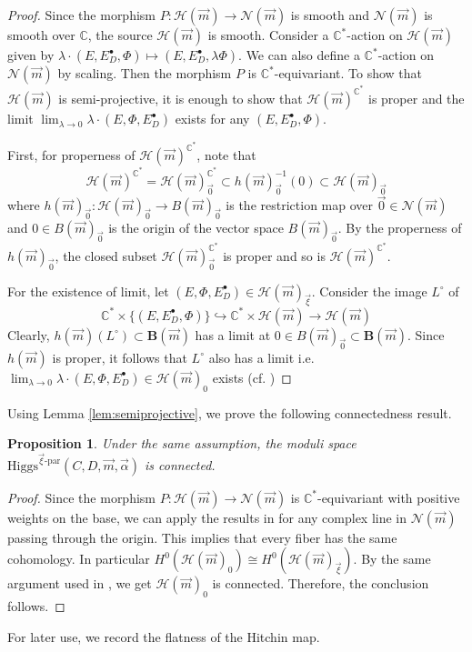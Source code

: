 \documentclass[11pt]{amsart}
\theoremstyle{plain}
\newtheorem{proposition}[theorem]{Proposition}
\theoremstyle{definition}
\theoremstyle{remark}
\newcommand{\C}{\mathbb C}
\newcommand{\Higgs}{\mathrm{Higgs}}
\newcommand{\nmd}{\mathcal{N}(\vec{m})}
\def\C{\mathbb{C}}
\def\m{\mu}
\def\m{\mathcal}
\def\vxi{\vec{\xi}}
\def\vm{\vec{m}}
\def\nm{\mathcal{N}(\vm)}
\begin{document}
\begin{proof}
Since the morphism $P:\bm{\m{H}}(\vm) \to \nmd$ is smooth and $\nmd$ is smooth over $\C$, the source $\bm{\m{H}}(\vm)$ is smooth. Consider a $\C^*$-action on $\bm{{\m{H}}}(\vec{m})$ given by $\lambda \cdot (E,E_D^\bullet, \Phi) \mapsto (E,E_D^\bullet, \lambda\Phi)$. We can also define a $\C^*$-action on $\nmd$ by scaling. Then the morphism $P$ is $\C^*$-equivariant. To show that $\bm{\m{H}}(\vm)$ is semi-projective, it is enough to show that ${\bm{\m{H}}(\vm)}^{\C^*}$ is proper and the limit $\lim_{\lambda \to 0} \lambda \cdot (E,\Phi,E^\bullet_D)$ exists for any $(E,E_D^\bullet, \Phi)$. 

First, for properness of ${\bm{\m{H}}(\vm)}^{\C^*}$, note that 
    \[
    \bm{\m{H}}(\vm)^{\C^*}=  \m{H}(\vm)_{\vec{0}}^{\C^*}\subset h(\vm)^{-1}_{\vec{0}}(0)\subset \m{H}(\vm)_{\vec{0}} 
    \]
where $h(\vm)_{\vec{0}}: \m{H}(\vm)_{\vec{0}}\to B(\vm)_{\vec{0}}$ is the restriction map over $\vec{0} \in \nm$ and $0\in B(\vm)_{\vec{0}}$ is the origin of the vector space $B(\vm)_{\vec{0}}$. By the properness of $h(\vm)_{\vec{0}}$, the closed subset $\m{H}(\vm)_{\vec{0}}^{\C^*}$ is proper and so is $\bm{\m{H}}(\vm)^{\C^*}$.

For the existence of limit, let $(E,\Phi,E^\bullet_D)\in \mathcal{H}(\vm)_{\vxi}$. Consider the image $L^\circ$ of 
        \[ \C^*\times \{(E,E^\bullet_D, \Phi)\} \hookrightarrow \C^*\times \bm{\m{H}}(\vm)\to \bm{\m {H}}(\vm)  \]
        Clearly, $h(\vm)(L^\circ)\subset \bm{B}(\vm)$ has a limit at $0\in B(\vm)_{\vec{0}}\subset \bm{B}(\vm).$ Since $h(\vm)$ is proper, it follows that $L^\circ $ also has a limit i.e. $\lim_{\lambda \to 0} \lambda \cdot (E,\Phi,E^\bullet_D)\in \m{H}(\vm)_0$ exists (cf. \cite[Theorem 5.2]{Yokogawa-infinitesimal})
    \end{proof}

Using Lemma \ref{lem:semiprojective}, we prove the following connectedness result. 

\begin{proposition}\label{prop:connected}
Under the same assumption, the moduli space $
\Higgs^{\vec\xi\text{-par}}(C,D,\vec m,\vec\alpha)$ is connected. 
\end{proposition}
\begin{proof}
    Since the morphism $P:\bm{\m{H}}(\vm)\to \nmd$ is $\C^*$-equivariant with positive weights on the base, we can apply the results in \cite[Theorem 7.2.1]{HLRV2011Ari} for any complex line in $\nmd$ passing through the origin. This implies that every fiber has the same cohomology. In particular $H^0(\m{H}(\vec{m})_0) \cong H^0(\m{H}(\vec{m})_{\vec{\xi}})$. By the same argument used in \cite[Theorem 5.2]{Yokogawa-infinitesimal}, we get $\m{H}(\vec{m})_0$ is connected. Therefore, the conclusion follows. 
\end{proof}
For later use, we record the flatness of the Hitchin map.
\end{document}
